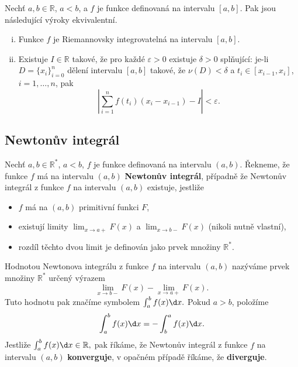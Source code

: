 \begin{veta}\label{veta8.25}
Nechť $a,b \in \mathbb{R}$, $a<b$, a $f$ je funkce definovaná na intervalu $[a,b]$.
Pak jsou následující výroky ekvivalentní.
\begin{enumerate}[(i)]
	\item Funkce $f$ je Riemannovsky integrovatelná na intervalu $[a,b]$.
	\item Existuje $I \in \mathbb{R}$ takové, že pro každé $\varepsilon > 0$ existuje $\delta > 0$ splňující:
	je-li $D=\{x_i\}_{i=0}^n$ dělení intervalu $[a,b]$ takové, že $\nu(D)<\delta$ a $t_i \in [x_{i-1},x_i]$, $i=1,\dots,n$, pak
\[
\left| \sum_{i=1}^n f(t_i)(x_i - x_{i-1}) - I \right| < \varepsilon.
\]
\end{enumerate}
\end{veta}

\subsection{Newtonův integrál}
\begin{definice}
Nechť $a, b \in \mathbb{R}^\ast$, $a < b$, $f$ je funkce definovaná na intervalu $(a, b)$. Řekneme, že funkce $f$ má na intervalu $(a, b)$ \textbf{Newtonův integrál}, případně že Newtonův integrál z funkce $f$ na intervalu $(a, b)$ existuje, jestliže

\begin{itemize}
\item $f$ má na $(a, b)$ primitivní funkci $F$,
\item existují limity $\lim_{x \to a+} F(x)$ a $\lim_{x \to b-} F(x)$ (nikoli nutně vlastní),
\item rozdíl těchto dvou limit je definován jako prvek množiny $\mathbb{R}^\ast$.
\end{itemize}
\end{definice}

\begin{definice}
Hodnotou Newtonova integrálu z funkce $f$ na intervalu $(a, b)$ nazýváme prvek množiny $\mathbb{R}^\ast$ určený výrazem
\[
\lim_{x \to b-} F(x) - \lim_{x \to a+} F(x).
\]
Tuto hodnotu pak značíme symbolem
$
\int_a^b f(x)\d x.
$
Pokud $a > b$, položíme
\[
\int_a^b f(x)\d x = - \int_b^a f(x)\d x.
\]
Jestliže
$
\int_a^b f(x)\d x \in \mathbb{R},
$
pak říkáme, že Newtonův integrál z funkce $f$ na intervalu $(a, b)$ \textbf{konverguje}, v opačném případě říkáme, že \textbf{diverguje}.
\end{definice}

